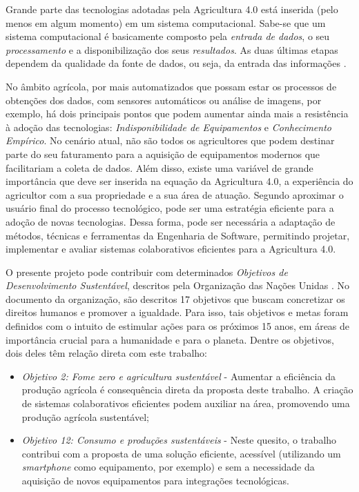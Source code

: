 Grande parte das tecnologias adotadas pela Agricultura 4.0 está inserida (pelo menos em algum momento) em um sistema computacional. Sabe-se que um sistema computacional é basicamente composto pela \textit{entrada de dados}, o seu \textit{processamento} e a disponibilização dos seus \textit{resultados}. As duas últimas etapas dependem da qualidade da fonte de dados, ou seja, da entrada das informações \cite{Torres:2013}.

No âmbito agrícola, por mais automatizados que possam estar os processos de obtenções dos dados, com sensores automáticos ou análise de imagens, por exemplo, há dois principais pontos que podem aumentar ainda mais a resistência à adoção das tecnologias: \textit{Indisponibilidade de Equipamentos} e \textit{Conhecimento Empírico}. No cenário atual, não são todos os agricultores que podem destinar parte do seu faturamento para a aquisição de equipamentos modernos que facilitariam a coleta de dados. Além disso, existe uma variável de grande importância que deve ser inserida na equação da Agricultura 4.0, a experiência do agricultor com a sua propriedade e a sua área de atuação. Segundo  aproximar o usuário final do processo tecnológico, pode ser uma estratégia eficiente para a adoção de novas tecnologias. Dessa forma, pode ser necessária a adaptação de métodos, técnicas e ferramentas da Engenharia de Software, permitindo projetar, implementar e avaliar sistemas colaborativos eficientes para a Agricultura 4.0.

O presente projeto pode contribuir com determinados \textit{Objetivos de Desenvolvimento Sustentável}, descritos pela Organização das Nações Unidas \cite{ONU:2020}. No documento da organização, são descritos 17 objetivos que buscam concretizar os direitos humanos e promover a igualdade. Para isso, tais objetivos e metas foram definidos com o intuito de estimular ações para os próximos 15 anos, em áreas de importância crucial para a humanidade e para o planeta. Dentre os objetivos, dois deles têm relação direta com este trabalho:

\begin{itemize}
	\item \textit{Objetivo 2: Fome zero e agricultura sustentável} - Aumentar a eficiência da produção agrícola é consequência direta da proposta deste trabalho. A criação de sistemas colaborativos eficientes podem auxiliar na área, promovendo uma produção agrícola sustentável;
	\item \textit{Objetivo 12: Consumo e produções sustentáveis} - Neste quesito, o trabalho contribui com a proposta de uma solução eficiente, acessível (utilizando um \textit{smartphone} como equipamento, por exemplo) e sem a necessidade da aquisição de novos equipamentos para integrações tecnológicas.
\end{itemize}

